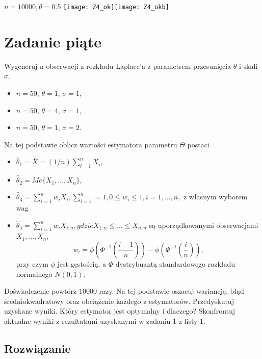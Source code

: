 \documentclass[a4paper]{article}
\begin{document}
\begin{center}
$n=10000,\theta=0.5$
\texttt{[image: Z4\_ok]}\texttt{[image: Z4\_okb]} 
\end{center}

\newpage

\section{Zadanie piąte}
Wygeneruj n obserwacji z rozkładu Laplace'a z parametrem przesunięcia $\theta$ i skali $\sigma$.
\begin{itemize}
	\item $n=50$, $\theta=1$, $\sigma=1$,
	\item $n=50$, $\theta=4$, $\sigma=1$,
	\item $n=50$, $\theta=1$, $\sigma=2$.
\end{itemize}
Na tej podstawie oblicz wartości estymatora parametru $\Theta$ postaci
\begin{itemize}
\item $\hat{\theta}_1 = \bar{X} = (1/n)\sum_{i=1}^nX_i$,
\item $\hat{\theta}_2 = Me\{X_1,...,X_n\},$
\item $\hat{\theta}_3 = \sum_{i=1}^nw_iX_i,\sum_{i=1}^n=1,0\leq w_i\leq 1,i=1,...,n,$ z własnym wyborem wag
\item $\hat{\theta}_4 = \sum_{i=1}^nw_iX_{i:n}, gdzie X_{1:n}\leq\hdots\leq X_{n:n}$ są uporządkowanymi obserwacjami $X_1,...,X_n$,$$w_i=\phi(\Phi^{-1}(\frac{i-1}{n}))-\phi(\Phi^{-1}(\frac{i}{n})),$$ przy czym $\phi$ jest gęstością, a $\Phi$ dystrybuantą standardowego rozkładu normalnego $N(0,1)$.
\end{itemize}
Doświadczenie powtórz $10 000$ razy. Na tej podstawie oszacuj wariancję, błąd średniokwadratowy oraz obciążenie każdego z estymatorów. Przedyskutuj uzyskane wyniki. Który estymator jest optymalny i dlaczego? Skonfrontuj aktualne wyniki z rezultatami uzyskanymi w zadaniu 1 z listy 1.

\subsection{Rozwiązanie}
\end{document}
